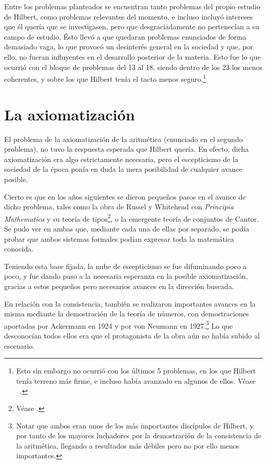 Entre los problemas planteados se encuentran tanto problemas del propio estudio de Hilbert, como problemas relevantes del momento, e incluso incluyó intereses que él quería que se
investigasen, pero que desgraciadamente no pertenecían a su campo de estudio. Ésto llevó a que quedaran problemas enunciados de forma demasiado vaga, lo que provocó un desinterés 
general en la sociedad y que, por ello, no fueran influyentes en el desarrollo posterior de la materia. Esto fue lo que ocurrió con el bloque de problemas del 13 al 18, siendo dentro
de los 23 los menos coherentes, y sobre los que Hilbert tenía el tacto menos seguro.\footnote{Esto sin embargo no ocurrió con los últimos 5 problemas, en los que Hilbert tenía terreno
más firme, e incluso había avanzado en algunos de ellos. Véase ~\cite[Pág. 85]{BREZIS199876}.}  


\section{La axiomatización}

El problema de la axiomatización de la aritmética (enunciado en el segundo problema), no tuvo la respuesta esperada que Hilbert quería. En efecto, dicha axiomatización
era algo estrictamente necesaria, pero el escepticismo de la sociedad de la época ponía en duda la mera posibilidad de cualquier avance posible.

Cierto es que en los años siguientes se dieron pequeños pasos en el avance de dicho problema, tales como la obra de Russel y Whitehead con \textit{Principia Mathematica}
y su teoría de tipos\footnote{Véase \cite{an1910principia}.}, o la emergente teoría de conjuntos de Cantor. Se pudo ver en ambas que, mediante cada una de ellas por separado, se podía probar 
que ambos sistemas formales podían expresar toda la matemática conocida.

Teniendo esta base fijada, la nube de escepticismo se fue difuminando poco a poco, y fue dando paso a la necesaria esperanza en la posible axiomatización, gracias a estos 
pequeños pero necesarios avances en la dirección buscada. 

En relación con la consistencia, también se realizaron importantes avances en la misma mediante la demostración de la teoría de números, con demostraciones aportadas por Ackermann en 1924 y por 
von Neumann en 1927.\footnote{Notar que ambos eran unos de los más importantes discípulos de Hilbert, y por tanto de los mayores luchadores por la demostración de la consistencia de la aritmética, 
llegando a resultados más débiles pero no por ello menos importantes.} Lo que desconocían todos ellos era que el protagonista de la obra aún no había subido al escenario.


